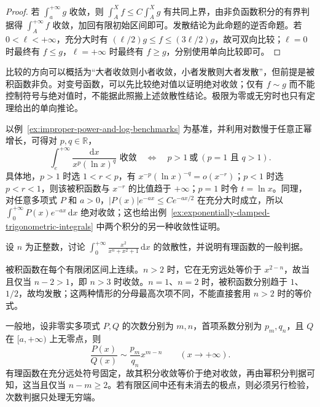 \documentclass[UTF8,12pt,a4paper,fontset=fandol]{ctexbook}
\begin{document}
\begin{proof}
若 $\int_a^{+\infty}g$ 收敛，则 $\int_A^Xf\leq C\int_A^Xg$ 有共同上界，由非负函数积分的有界判据得 $\int_A^{+\infty}f$ 收敛，加回有限初始区间即可。发散结论为此命题的逆否命题。若 $0<\ell<+\infty$，充分大时有 $(\ell/2)g\leq f\leq(3\ell/2)g$，故可双向比较；$\ell=0$ 时最终有 $f\leq g$，$\ell=+\infty$ 时最终有 $f\geq g$，分别使用单向比较即可。
\end{proof}

比较的方向可以概括为“大者收敛则小者收敛，小者发散则大者发散”，但前提是被积函数非负。对变号函数，可以先比较绝对值以证明绝对收敛；仅有 $f\sim g$ 而不能控制符号与绝对值时，不能据此照搬上述敛散性结论。极限为零或无穷时也只有定理给出的单向推论。

以例~\ref{ex:improper-power-and-log-benchmarks} 为基准，并利用对数慢于任意正幂增长，可得对 $p,q\in\mathbb{R}$，
\begin{equation}
    \int_e^{+\infty}\frac{\mathrm{d}x}{x^p(\ln x)^q}
    \text{ 收敛}\quad\Longleftrightarrow\quad
    p>1\ \text{或}\ (p=1\text{ 且 }q>1).
    \label{eq:power-log-infinite-integral-test}
\end{equation}
具体地，$p>1$ 时选 $1<r<p$，有 $x^{-p}(\ln x)^{-q}=o(x^{-r})$；$p<1$ 时选 $p<r<1$，则该被积函数与 $x^{-r}$ 的比值趋于 $+\infty$；$p=1$ 时令 $t=\ln x$。同理，对任意多项式 $P$ 和 $a>0$，$|P(x)|e^{-ax}\leq Ce^{-ax/2}$ 在充分大时成立，所以 $\int_0^{+\infty}P(x)e^{-ax}\,\mathrm{d}x$ 绝对收敛；这也给出例~\ref{ex:exponentially-damped-trigonometric-integrals} 中两个积分的另一种收敛性证明。

\begin{example}
\label{ex:rational-infinite-integral-degree-test}
设 $n$ 为正整数，讨论 $\int_0^{+\infty}\frac{x^2}{x^n+x^2+1}\,\mathrm{d}x$ 的敛散性，并说明有理函数的一般判据。
\end{example}

\begin{solve}
被积函数在每个有限闭区间上连续。$n>2$ 时，它在无穷远处等价于 $x^{2-n}$，故当且仅当 $n-2>1$，即 $n>3$ 时收敛。$n=1$、$n=2$ 时，被积函数分别趋于 $1$、$1/2$，故均发散；这两种情形的分母最高次项不同，不能直接套用 $n>2$ 时的等价式。

一般地，设非零实多项式 $P,Q$ 的次数分别为 $m,n$，首项系数分别为 $p_m,q_n$，且 $Q$ 在 $[a,+\infty)$ 上无零点，则
\[
    \frac{P(x)}{Q(x)}\sim\frac{p_m}{q_n}x^{m-n}
    \qquad(x\to+\infty).
\]
有理函数在充分远处符号固定，故其积分收敛等价于绝对收敛，再由幂积分判据可知，这当且仅当 $n-m\geq2$。若有限区间中还有未消去的极点，则必须另行检验，次数判据只处理无穷端。
\end{solve}
\end{document}
